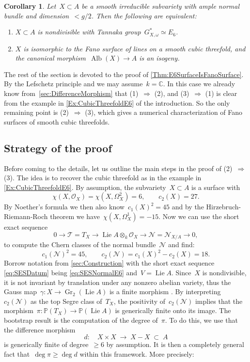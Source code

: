 \documentclass[a4paper]{amsart}
\newcommand{\bbC}{\mathbb{C}}
\newcommand{\bbP}{\mathbb{P}}
\newcommand{\cN}{\mathcal{N}}
\newcommand{\cO}{\mathcal{O}}
\newcommand{\cT}{\mathcal{T}}
\newcommand{\too}{\longrightarrow}
\DeclareMathOperator{\Alb}{Alb}
\DeclareMathOperator{\Gr}{Gr}
\DeclareMathOperator{\Lie}{Lie}
\renewcommand{\ge}{\geqslant}
\theoremstyle{plain}
\newtheorem{corollary}[theorem]{Corollary}
\theoremstyle{definition}
\numberwithin{equation}{section}
\begin{document}
\begin{corollary} \label{Thm:E6VarietyIsFanoSurface} Let~$X \subset A$ be a  smooth irreducible subvariety with ample normal bundle and dimension~$< g/2$. Then the following are equivalent:
\begin{enumerate}
\item $X\subset A$ is nondivisible with Tannaka group~$G_{X,\omega}^\ast \simeq E_6$.\smallskip
\item $X$ is isomorphic to the Fano surface of lines on a smooth cubic threefold, and the canonical morphism~$\Alb(X) \to A$ is an isogeny.
\end{enumerate}
\end{corollary}

The rest of the section is devoted to the proof of \cref{Thm:E6SurfaceIsFanoSurface}. By the Lefschetz principle and \cite[cor. 4.4]{JKLM} we may assume~$k = \bbC$. In this case we already know from~\cref{sec:DifferenceMorphism} that (1)~$\Rightarrow$ (2), and (3)~$\Rightarrow$ (1) is clear from the example in \cref{Ex:CubicThreefoldE6} of the introduction. So the only remaining point is (2)~$\Rightarrow$ (3), which gives a numerical characterization of Fano surfaces of smooth cubic threefolds.

\subsection{Strategy of the proof}\label{section strategy of the proof}

Before coming to the details, let us outline the main steps in the proof of (2)~$\Rightarrow$ (3). The idea is to recover the cubic threefold as in the example in \cref{Ex:CubicThreefoldE6}. By assumption, the subvariety~$X\subset A$ is a surface with
\[ \chi(X, \cO_X) = \chi(X, \Omega^2_X) = 6, 
\qquad c_2(X) = 27. \]
By Noether's formula we then also know~$c_1(X)^2 = 45$ and by the Hirzebruch-Riemann-Roch theorem we have~$\chi(X, \Omega^1_X) = -15$.
Now we can use the short exact sequence
\begin{equation} \label{eq:SESNormalE6}
 0 \too \cT = T_X \too \Lie A \otimes_k \cO_X \too \cN = \cN_{X/A} \too 0,
 \end{equation}
 to compute the Chern classes of the normal bundle~$\cN$ and find:
\[ c_1(\cN)^2 = 45, \qquad c_2(\cN) = c_1(X)^2 - c_2(X) = 18.\]
Borrow notation from \cref{sec:Construction} with the short exact sequence \eqref{eq:SESDatum} being \eqref{eq:SESNormalE6} and~$V = \Lie A$. Since~$X$ is nondivisible, it is not invariant by translation under any nonzero abelian variety, thus the Gauss map~$\gamma\colon X \to \Gr_2(\Lie A)$ is a finite morphism \cite[prop. 3.1]{Deb95}. By interpreting~$c_2(\cN)$ as the top Segre class of~$T_X$, the positivity of~$c_2(\cN)$ implies that the morphism~$\pi \colon \bbP(T_X) \to \bbP(\Lie A)$ is generically finite onto its image.
The bootstrap result is the computation of the degree of~$\pi$. To do this, we use that the difference morphism
%
\[
 d\colon \quad X \times X \;\longrightarrow\; X - X \;\subset\; A
\]
%
is generically finite of degree~$\ge 6$ by assumption. 
It is then a completely general fact that~$\deg \pi \ge \deg d$ within this framework. More precisely:
\end{document}
